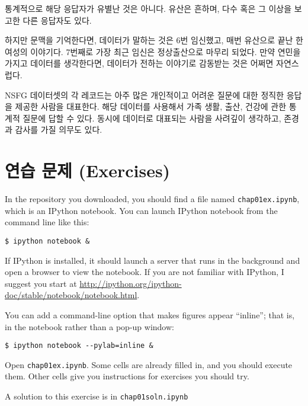 통계적으로 해당 응답자가 유별난 것은 아니다. 유산은 흔하며, 다수 혹은 그 이상을 보고한 다른 응답자도 있다. 

하지만 문맥을 기억한다면, 데이터가 말하는 것은 6번 임신했고, 매번 유산으로 끝난 한 여성의 이야기다.
7번째로 가장 최근 임신은 정상출산으로 마무리 되었다. 만약 연민을 가지고 데이터를 생각한다면, 데이터가 전하는 이야기로 감동받는 것은 어쩌면 자연스럽다. 

NSFG 데이터셋의 각 레코드는 아주 많은 개인적이고 어려운 질문에 대한 정직한 응답을 제공한 사람을 대표한다. 해당 데이터를 사용해서 가족 생활, 출산, 건강에 관한 통계적 질문에 답할 수 있다. 동시에 데이터로 대표되는 사람을 사려깊이 생각하고, 존경과 감사를 가질 의무도 있다.



\section{연습 문제 (Exercises)}

\begin{exercise}
In the repository you downloaded, you should find a file named
\verb"chap01ex.ipynb", which is an IPython notebook.  You can
launch IPython notebook from the command line like this:

\begin{verbatim}
$ ipython notebook &
\end{verbatim}

If IPython is installed, it should launch a server that runs in the
background and open a browser to view the notebook.  If you are not
familiar with IPython, I suggest you start at
\url{http://ipython.org/ipython-doc/stable/notebook/notebook.html}.

You can add a command-line option that makes figures appear ``inline'';
that is, in the notebook rather than a pop-up window:

\begin{verbatim}
$ ipython notebook --pylab=inline &
\end{verbatim}

Open \verb"chap01ex.ipynb".  Some cells are already filled in, and
you should execute them.  Other cells give you instructions for
exercises you should try.

A solution to this exercise is in \verb"chap01soln.ipynb"
\end{exercise}


